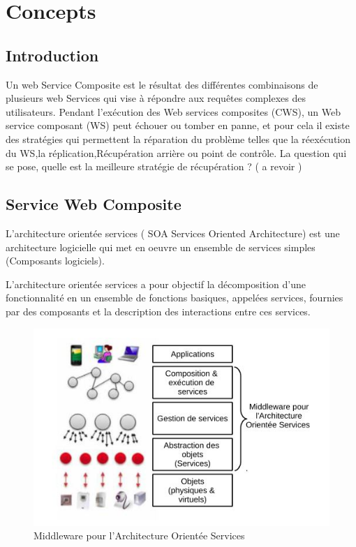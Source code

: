 
\chapter{Concepts}

\section{Introduction}

Un web Service Composite est  le résultat des différentes combinaisons de plusieurs web Services qui vise à répondre aux requêtes complexes des utilisateurs.
Pendant l'exécution des Web services composites (CWS), un Web service composant (WS) peut échouer ou tomber en panne, et pour cela il existe des stratégies qui permettent la réparation du problème telles que  la réexécution du WS,la réplication,Récupération arrière ou point de contrôle.
La question qui se pose, quelle est la meilleure stratégie de récupération ? 
( a revoir ) 

\section{Service Web Composite}

L'architecture orientée services ( SOA Services Oriented Architecture) est une architecture logicielle qui met en oeuvre un ensemble de services simples (Composants logiciels).

L'architecture orientée services a pour objectif la décomposition d'une fonctionnalité en un ensemble de fonctions basiques, appelées services, fournies par des composants et la description des interactions entre ces services.


\begin{figure}[H]
\begin{center}
\includegraphics[width=1\linewidth]{images/MiddlewareSOA.jpg}
\end{center}
\caption{Middleware pour l’Architecture Orientée Services}
\label{fig:1}
\end{figure}

